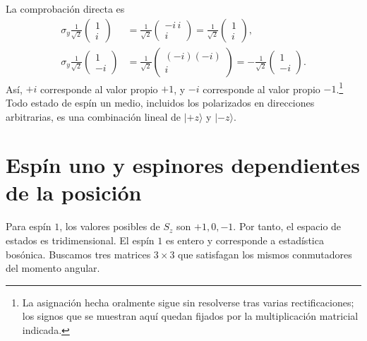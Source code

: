 \begin{classroomqa}
\end{classroomqa}

La comprobación directa es
\begin{align}
\sigma_y\frac{1}{\sqrt2}
\begin{pmatrix}
1\\
i
\end{pmatrix}
&=
\frac{1}{\sqrt2}
\begin{pmatrix}
-i\,i\\
i
\end{pmatrix}
=
\frac{1}{\sqrt2}
\begin{pmatrix}
1\\
i
\end{pmatrix},\\
\sigma_y\frac{1}{\sqrt2}
\begin{pmatrix}
1\\
-i
\end{pmatrix}
&=
\frac{1}{\sqrt2}
\begin{pmatrix}
(-i)(-i)\\
i
\end{pmatrix}
=
-\frac{1}{\sqrt2}
\begin{pmatrix}
1\\
-i
\end{pmatrix}.
\end{align}
Así, \(+i\) corresponde al valor propio \(+1\), y \(-i\) corresponde al valor propio \(-1\).\footnote{La asignación hecha oralmente sigue sin resolverse tras varias rectificaciones; los signos que se muestran aquí quedan fijados por la multiplicación matricial indicada.} Todo estado de espín un medio, incluidos los polarizados en direcciones arbitrarias, es una combinación lineal de \(|+z\rangle\) y \(|-z\rangle\).

\section{Espín uno y espinores dependientes de la posición}

Para espín \(1\), los valores posibles de \(S_z\) son \(+1,0,-1\). Por tanto, el espacio de estados es tridimensional. El espín \(1\) es entero y corresponde a estadística bosónica. Buscamos tres matrices \(3\times3\) que satisfagan los mismos conmutadores del momento angular.

